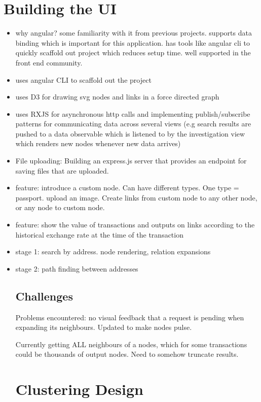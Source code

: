 \section{Building the UI} 
\begin{itemize}
    \item why angular? some familiarity with it from previous projects. supports data binding which is important for this application. has tools like angular cli to quickly scaffold out project which reduces setup time. well supported in the front end community. 
    \item uses angular CLI to scaffold out the project
    \item uses D3 for drawing svg nodes and links in a force directed graph 
    \item uses RXJS for asynchronous http calls and implementing publish/subscribe patterns for communicating data across several views (e.g search results are pushed to a data observable which is listened to by the investigation view which renders new nodes whenever new data arrives) 
    \item File uploading: Building an express.js server that provides an endpoint for saving files that are uploaded. 
    
    \item feature: introduce a custom node. Can have different types. One type = passport. upload an image. Create links from custom node to any other node, or any node to custom node. 
    \item feature: show the value of transactions and outputs on links according to the historical exchange rate at the time of the transaction 
    
    \item stage 1: search by address. node rendering, relation expansions
    \item stage 2: path finding between addresses
    
\subsection{Challenges}
Problems encountered: no visual feedback that a request is pending when expanding its neighbours. Updated to make nodes pulse. 

Currently getting ALL neighbours of a nodes, which for some transactions could be thousands of output nodes. Need to somehow truncate results.

\section{Clustering Design}

\end{itemize}
